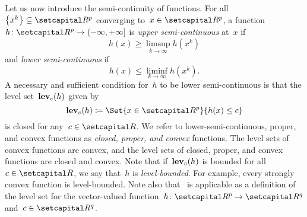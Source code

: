 \documentclass[../main]{subfiles}
\begin{document}
Let us now introduce the semi-continuity of functions.
For all~$\set*{x^k} \subseteq \setR^p$ converging to~$x \in \setR^p$, a function~$h \colon \setR^p \to (-\infty, +\infty]$ is \emph{upper semi-continuous} at~$x$ if
\begin{equation}
    h(x) \ge \limsup_{k \to \infty} h\left(x^k\right) 
\end{equation} 
and \emph{lower semi-continuous} if
\begin{equation}
    h(x) \le \liminf_{k \to \infty} h\left(x^k\right) 
.\end{equation} 
A necessary and sufficient condition for~$h$ to be lower semi-continuous is that the level set~$\operatorname{\mathbf{lev}}_c(h)$ given by
\begin{equation} \label{eq:level}
    \level_c(h) \coloneqq \Set{x \in \setR^p}{h(x) \le c}
\end{equation} 
is closed for any~$c \in \setR$.
We refer to lower-semi-continuous, proper, and convex functions as \emph{closed, proper, and convex} functions.
The level sets of convex functions are convex, and the level sets of closed, proper, and convex functions are closed and convex.
Note that if~$\operatorname{\mathbf{lev}}_c(h)$ is bounded for all~$c \in \setR$, we say that~$h$ is \emph{level-bounded}.
For example, every strongly convex function is level-bounded.
Note also that~ is applicable as a definition of the level set for the vector-valued function~$h \colon \setR^p \to \setR^q$ and~$c \in \setR^q$.
\end{document}
